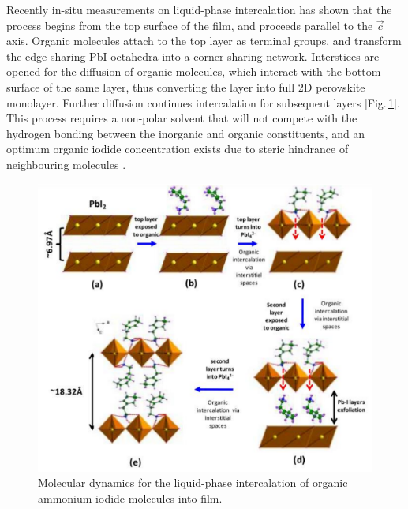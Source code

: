 Recently in-situ measurements on liquid-phase intercalation has shown that the process begins from the top surface of the  film, and proceeds parallel to the $\vec{c}$ axis. Organic molecules attach to the top  layer as terminal groups, and transform the edge-sharing PbI octahedra into a corner-sharing network. Interstices are opened for the diffusion of organic molecules, which interact with the bottom surface of the same layer, thus converting the  layer into full 2D perovskite monolayer. Further diffusion continues intercalation for subsequent layers [Fig.\,\ref{2Fig7}]. This process requires a non-polar solvent that will not compete with the hydrogen bonding between the inorganic and organic constituents, and an optimum organic iodide concentration exists due to steric hindrance of neighbouring molecules \cite{Ahmad2014}.
\begin{figure} [h!]
\centering
\includegraphics[width=\textwidth]{Fig7}
\caption{Molecular dynamics for the liquid-phase intercalation of organic ammonium iodide molecules into  film.}
\label{2Fig7}
\end{figure}

